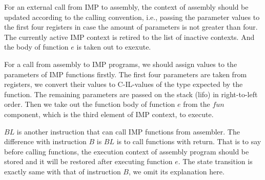 \documentclass[letterpaper, 10 pt, conference]{IEEEtran}
\begin{document}
 For an external call from IMP to assembly, the context of assembly should be updated according to the calling convention, i.e., passing the parameter values to the first four registers in case the amount of parameters is not greater than four. The currently
active IMP context is retired to the list of inactive contexts. And the body of function $e$ is taken out to exexute.
\par For a call from assembly to IMP programs, we should assign values to the parameters of IMP functions firstly. The first four parameters are taken from registers, we convert their values to C-IL-values
of the type expected by the function. The remaining parameters are passed on the stack
(lifo) in right-to-left order. Then we take out the function body of function $e$ from the $fun$ component, which is the third element of IMP context, to execute.
\par $BL$ is another instruction that can call IMP functions from assembler. The difference with instruction $B$ is $BL$ is to call functions with return. That is to say before calling functions, the execution context of assembly program should be stored and it will be restored after executing function $e$. The state transition is exactly same with that of instruction $B$, we omit its explanation here.
\end{document}
